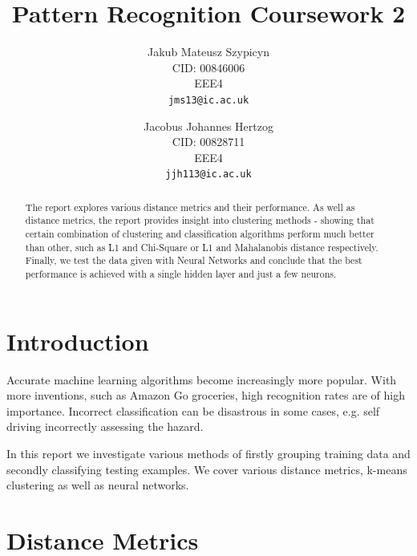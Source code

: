 \documentclass[10pt,twocolumn,letterpaper]{article}
\begin{document}
\title{Pattern Recognition Coursework 2}

\author{Jakub Mateusz Szypicyn\\
CID: 00846006\\
EEE4\\
{\tt\small jms13@ic.ac.uk}
\and
Jacobus Johannes Hertzog\\
CID: 00828711\\
EEE4\\
{\tt\small jjh113@ic.ac.uk}
}

\maketitle

\begin{abstract}
The report explores various distance metrics and their performance. As well as distance metrics, the report provides insight into clustering methods - showing that certain combination of clustering and classification algorithms perform much better than other, such as L1 and Chi-Square or L1 and Mahalanobis distance respectively. Finally, we test the data given with Neural Networks and conclude that the best performance is achieved with a single hidden layer and just a few neurons.

\end{abstract}
\vspace{-8mm}
\section{Introduction}

Accurate machine learning algorithms become increasingly more popular. With more inventions, such as Amazon Go groceries, high recognition rates are of high importance. Incorrect classification can be disastrous in some cases, e.g. self driving incorrectly assessing the hazard.

In this report we investigate various methods of firstly grouping training data and secondly classifying testing examples. We cover various distance metrics, k-means clustering as well as neural networks.

\section{Distance Metrics}
\end{document}
